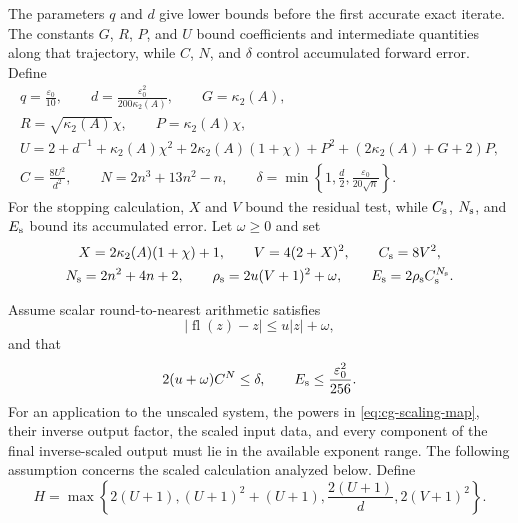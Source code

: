 \documentclass[11pt]{article}
\theoremstyle{definition}
\newcommand{\fl}{\operatorname{fl}}
\begin{document}
The parameters $q$ and $d$ give lower bounds before the first accurate
exact iterate.  The constants $G$, $R$, $P$, and $U$ bound coefficients
and intermediate quantities along that trajectory, while $C$, $N$, and
$\delta$ control accumulated forward error.
Define
\begin{gather}
 q=\frac{\varepsilon_0}{10},
 \qquad
 d=\frac{\varepsilon_0^2}{200\kappa_2(A)},
 \qquad
 G=\kappa_2(A),
 \label{eq:cg-qdg}\\
 R=\sqrt{\kappa_2(A)}\chi,
 \qquad
 P=\kappa_2(A)\chi,
 \label{eq:cg-rp}\\
 U=2+d^{-1}+\kappa_2(A)\chi^2+2\kappa_2(A)(1+\chi)
      +P^2+(2\kappa_2(A)+G+2)P,                                    \label{eq:cg-U}\\
 C=\frac{8U^2}{d^2},
 \qquad
 N=2n^3+13n^2-n,
 \qquad
 \delta=\min\left\{1,\frac d2,
              \frac{\varepsilon_0}{20\sqrt n}\right\}.      \label{eq:cg-CNdelta}
\end{gather}
For the stopping calculation, $X$ and $V$ bound the residual test, while
$C_{\rm s}$, $N_{\rm s}$, and $E_{\rm s}$ bound its accumulated error.  Let
$\omega\ge0$ and set
\begin{gather}
 X=2\kappa_2(A)(1+\chi)+1,
 \qquad V=4(2+X)^2,
 \qquad C_{\rm s}=8V^2,                                      \label{eq:selector-scales}\\
 N_{\rm s}=2n^2+4n+2,
 \qquad
 \rho_{\rm s}=2u(V+1)^2+\omega,
 \qquad
 E_{\rm s}=2\rho_{\rm s}C_{\rm s}^{N_{\rm s}}.             \label{eq:selector-error}
\end{gather}

Assume scalar round-to-nearest arithmetic satisfies
\begin{equation}
 |\fl(z)-z|\le u|z|+\omega,                                   \label{eq:absolute-rounding}
\end{equation}
and that
\begin{equation}
 2(u+\omega)C^N\le\delta,
 \qquad
 E_{\rm s}\le\frac{\varepsilon_0^2}{256}.                   \label{eq:cg-smallness}
\end{equation}
For an application to the unscaled system, the powers in
\eqref{eq:cg-scaling-map}, their inverse output factor, the scaled input data,
and every component of the final inverse-scaled output must lie in the
available exponent range.  The following assumption concerns the scaled
calculation analyzed below.  Define
\begin{equation}
 H=\max\left\{2(U+1),(U+1)^2+(U+1),
              \frac{2(U+1)}d,2(V+1)^2\right\}.
 \label{eq:raw-range}
\end{equation}
\end{document}
